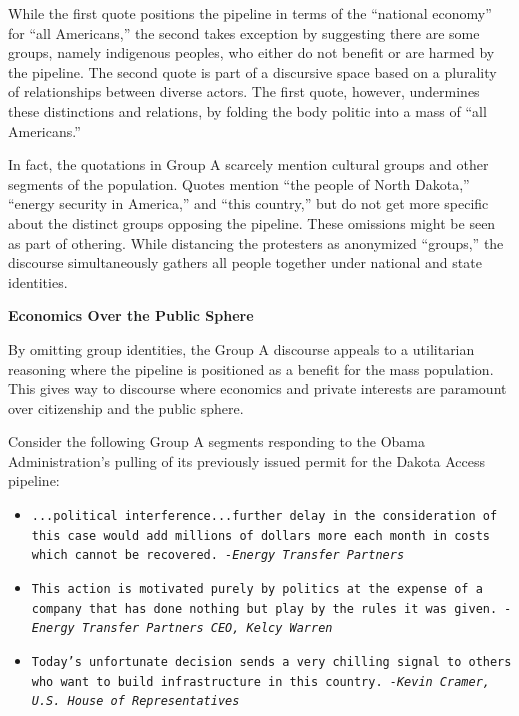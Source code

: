 While the first quote positions the pipeline in terms of the ``national economy'' for ``all Americans,'' the second takes exception by suggesting there are some groups, namely indigenous peoples, who either do not benefit or are harmed by the pipeline. The second quote is part of a discursive space based on a plurality of relationships between diverse actors. The first quote, however, undermines these distinctions and relations, by folding the body politic into a mass of ``all Americans.''

In fact, the quotations in Group A scarcely mention cultural groups and other segments of the population. Quotes mention ``the people of North Dakota,'' ``energy security in America,'' and ``this country,'' but do not get more specific about the distinct groups opposing the pipeline. These omissions might be seen as part of othering. While distancing the protesters as anonymized ``groups,'' the discourse simultaneously gathers all people together under national and state identities. 

\textbf{Economics Over the Public Sphere}

By omitting group identities, the Group A discourse appeals to a utilitarian reasoning where the pipeline is positioned as a benefit for the mass population. This gives way to discourse where economics and private interests are paramount over citizenship and the public sphere.

Consider the following Group A segments responding to the Obama Administration's pulling of its previously issued permit for the Dakota Access pipeline:

\begin{footnotesize}
\begin{itemize}
\item[] \texttt{...political interference...further delay in the consideration of this case would add millions of dollars more each month in costs which cannot be recovered.\newline 
\textit{-Energy Transfer Partners}}
\newline
\item[] \texttt{This action is motivated purely by politics at the expense of a company that has done nothing but play by the rules it was given. \newline   
\textit{-Energy Transfer Partners CEO, Kelcy Warren}}
\newline
\item[] \texttt{Today's unfortunate decision sends a very chilling signal to others who want to build infrastructure in this country.\newline    
\textit{-Kevin Cramer, U.S. House of Representatives}}
\end{itemize}
\end{footnotesize}

